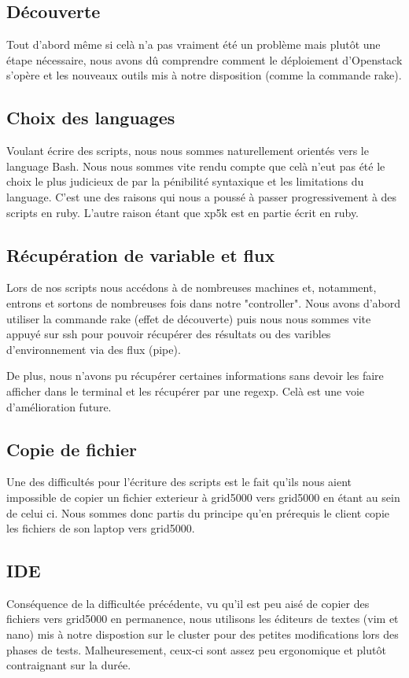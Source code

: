 \documentclass{report}
\begin{document}
        \subsection{Découverte}
            Tout d'abord même si celà n'a pas vraiment été un problème mais plutôt une étape nécessaire, nous avons dû comprendre comment le déploiement d'Openstack s'opère et les nouveaux outils mis à notre disposition (comme la commande rake).\bigbreak
        \subsection{Choix des languages}
            Voulant écrire des scripts, nous nous sommes naturellement orientés vers le language Bash. Nous nous sommes vite rendu compte que celà n'eut pas été le choix le plus judicieux de par la pénibilité syntaxique et les limitations du language. C'est une des raisons qui nous a poussé à passer progressivement à des scripts en ruby. L'autre raison étant que xp5k est en partie écrit en ruby.\bigbreak
        \subsection{Récupération de variable et flux}
            Lors de nos scripts nous accédons à de nombreuses machines et, notamment, entrons et sortons de nombreuses fois dans notre "controller". Nous avons d'abord utiliser la commande rake (effet de découverte) puis nous nous sommes vite appuyé sur ssh pour pouvoir récupérer des résultats ou des varibles d'environnement via des flux (pipe).\bigbreak
            
            De plus, nous n'avons pu récupérer certaines informations sans devoir les faire afficher dans le terminal et les récupérer par une regexp. Celà est une voie d'amélioration future.\bigbreak
            
        \subsection{Copie de fichier}
            Une des difficultés pour l'écriture des scripts est le fait qu'ils nous aient impossible de copier un fichier exterieur à grid5000 vers grid5000 en étant au sein de celui ci. Nous sommes donc partis du principe qu'en prérequis le client copie les fichiers de son laptop vers grid5000.\bigbreak
        
        \subsection{IDE}
            Conséquence de la difficultée précédente, vu qu'il est peu aisé de copier des fichiers vers grid5000 en permanence, nous utilisons les éditeurs de textes (vim et nano) mis à notre dispostion sur le cluster pour des petites modifications lors des phases de tests. Malheuresement, ceux-ci sont assez peu ergonomique et plutôt contraignant sur la durée.\bigbreak
            
\end{document}

